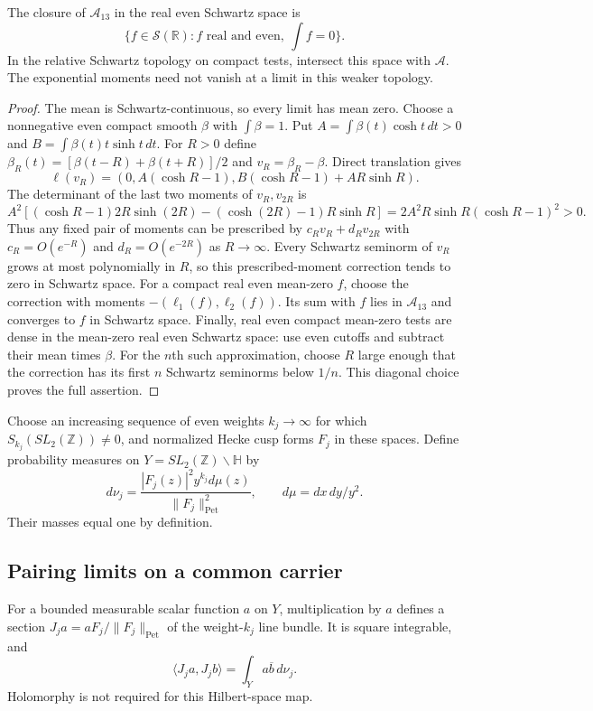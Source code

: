 \begin{theorem}
The closure of $\mathscr A_{13}$ in the real even Schwartz space is
\[
 \{f\in\mathcal S(\mathbb R):f\text{ real and even},\ \int f=0\}.
\]
In the relative Schwartz topology on compact tests, intersect this
space with $\mathscr A$. The exponential moments need not vanish
at a limit in this weaker topology.
\end{theorem}
\begin{proof}
The mean is Schwartz-continuous, so every limit has mean zero.
Choose a nonnegative even compact smooth $\beta$ with $\int\beta=1$.
Put $A=\int\beta(t)\cosh t\,dt>0$ and
$B=\int\beta(t)t\sinh t\,dt$.
For $R>0$ define $\beta_R(t)=[\beta(t-R)+\beta(t+R)]/2$ and
$v_R=\beta_R-\beta$. Direct translation gives
\[
 \ell(v_R)=(0,A(\cosh R-1),
                 B(\cosh R-1)+AR\sinh R).
\]
The determinant of the last two moments of $v_R,v_{2R}$ is
\[
 A^2[(\cosh R-1)2R\sinh(2R)
       -(\cosh(2R)-1)R\sinh R]
 =2A^2R\sinh R(\cosh R-1)^2>0.
\]
Thus any fixed pair of moments can be prescribed by
$c_Rv_R+d_Rv_{2R}$ with
$c_R=O(e^{-R})$ and $d_R=O(e^{-2R})$ as $R\to\infty$.
Every Schwartz seminorm of $v_R$ grows at most polynomially in $R$,
so this prescribed-moment correction tends to zero in Schwartz space.
For a compact real even mean-zero $f$, choose the correction with
moments $-(\ell_1(f),\ell_2(f))$. Its sum with $f$ lies in
$\mathscr A_{13}$ and converges to $f$ in Schwartz space.
Finally, real even compact mean-zero tests are dense in the
mean-zero real even Schwartz space: use even cutoffs and subtract
their mean times $\beta$. For the $n$th such approximation, choose
$R$ large enough that the correction has its first $n$ Schwartz
seminorms below $1/n$. This diagonal choice proves the full assertion.
\end{proof}

\begin{definition}
\label{v4-arith:w6-b:def:compatible-family}
Choose an increasing sequence of even weights $k_j\to\infty$ for
which $S_{k_j}(SL_2(\mathbb Z))\ne0$, and normalized Hecke cusp forms
$F_j$ in these spaces. Define probability measures on
$Y=SL_2(\mathbb Z)\backslash\mathbb H$ by
\[
 d\nu_j=\frac{|F_j(z)|^2y^{k_j}d\mu(z)}{\|F_j\|_{\mathrm{Pet}}^2},
 \qquad d\mu=dx\,dy/y^2.
\]
Their masses equal one by definition.
\end{definition}

\subsection{Pairing limits on a common carrier}
\label{v4-arith:w6-b:construction-II:petersson-limit}
For a bounded measurable scalar function $a$ on $Y$, multiplication
by $a$ defines a section $J_ja=aF_j/\|F_j\|_{\mathrm{Pet}}$ of the
weight-$k_j$ line bundle. It is square integrable, and
\[
 \langle J_ja,J_jb\rangle=\int_Ya\overline b\,d\nu_j.
\]
Holomorphy is not required for this Hilbert-space map.

